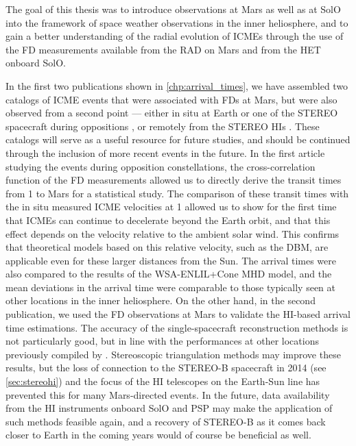 The goal of this thesis was to introduce observations at Mars as well as at \ac{SolO} into the framework of space weather observations in the inner heliosphere, and to gain a better understanding of the radial evolution of \acp{ICME} through the use of the \ac{FD} measurements available from the \ac{RAD} on Mars and from the \ac{HET} onboard \ac{SolO}.

In the first two publications shown in \autoref{chp:arrival_times}, we have assembled two catalogs of \ac{ICME} events that were associated with \acp{FD} at Mars, but were also observed from a second point --- either in situ at Earth or one of the \ac{STEREO} spacecraft during oppositions \citep{Forstner-2018}, or remotely from the \ac{STEREO} \acp{HI} \citep{Forstner-2019}. These catalogs will serve as a useful resource for future studies, and should be continued through the inclusion of more recent events in the future.
In the first article studying the events during opposition constellations, the cross-correlation function of the \ac{FD} measurements allowed us to directly derive the transit times from \SI{1}{\AU} to Mars for a statistical study. The comparison of these transit times with the in situ measured \ac{ICME} velocities at \SI{1}{\AU} allowed us to show for the first time that \acp{ICME} can continue to decelerate beyond the Earth orbit, and that this effect depends on the velocity relative to the ambient solar wind. This confirms that theoretical models based on this relative velocity, such as the \ac{DBM}, are applicable even for these larger distances from the Sun. The arrival times were also compared to the results of the WSA-ENLIL+Cone \ac{MHD} model, and the mean deviations in the arrival time were comparable to those typically seen at other locations in the inner heliosphere.
On the other hand, in the second publication, we used the \ac{FD} observations at Mars to validate the \ac{HI}-based arrival time estimations. The accuracy of the single-spacecraft reconstruction methods is not particularly good, but in line with the performances at other locations previously compiled by \citet{Moestl-2017-HelcatsHSO}. Stereoscopic triangulation methods may improve these results, but the loss of connection to the \ac{STEREO}-B spacecraft in 2014 (see \autoref{sec:stereohi}) and the focus of the \ac{HI} telescopes on the Earth-Sun line has prevented this for many Mars-directed events. In the future, data availability from the \ac{HI} instruments onboard \ac{SolO} and \ac{PSP} may make the application of such methods feasible again, and a recovery of \ac{STEREO}-B as it comes back closer to Earth in the coming years would of course be beneficial as well.

